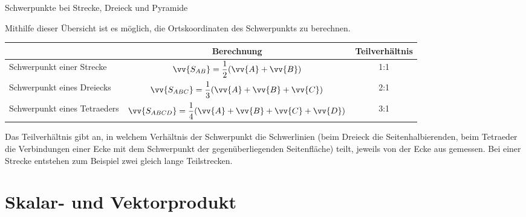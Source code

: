 \begin{merke}{Schwerpunkte bei Strecke, Dreieck und Pyramide}{}

Mithilfe dieser Übersicht ist es möglich, die Ortskoordinaten des Schwerpunkts zu berechnen.\\[0.5cm]
\begin{center}
\bgroup
\def\arraystretch{1.5}%
\begin{tabular}{|l|c|c|}
    \hline
    & Berechnung & Teilverhältnis \\[0.2cm]
     \hline
     \hline
     Schwerpunkt einer Strecke & $\vv{S_{AB}} = \dfrac{1}{2}(\vv{A} + \vv{B})$ & 1:1\\[0.2cm]
     \hline
     Schwerpunkt eines Dreiecks &$ \vv{S_{ABC}} = \dfrac{1}{3} (\vv{A} + \vv{B} + \vv{C})$ & 2:1\\[0.2cm]
     \hline
     Schwerpunkt eines Tetraeders & $\vv{S_{ABCD}} = \dfrac{1}{4}(\vv{A} + \vv{B} +\vv{C} + \vv{D})$ & 3:1\\[0.2cm]
     \hline
\end{tabular}
\egroup
\end{center}
Das Teilverhältnis gibt an, in welchem Verhältnis der Schwerpunkt die Schwerlinien (beim Dreieck die Seitenhalbierenden, beim Tetraeder die Verbindungen einer Ecke mit dem Schwerpunkt der gegenüberliegenden Seitenfläche) teilt, jeweils von der Ecke aus gemessen. Bei einer Strecke entstehen zum Beispiel zwei gleich lange Teilstrecken.
\end{merke}
\section{Skalar- und Vektorprodukt}

